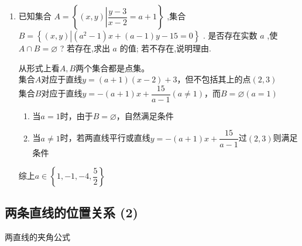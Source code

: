 \begin{enumerate}
    \item 已知集合 $A = \left\{  {\left( {x,y}\right) \left| {\dfrac{y - 3}{x - 2} = a + 1}\right. }\right\}$ ,集合 $B = \left\{  {\left( {x,y}\right) \left| {\left( {{a}^{2} - 1}\right) x + \left( {a - 1}\right) y - {15} = 0}\right. }\right\}$ . 是否存在实数 $a$ ,使 $A \cap  B = \varnothing$ ? 若存在,求出 $a$ 的值; 若不存在,说明理由.
    \begin{jieda}
        从形式上看$A, B$两个集合都是点集。\\
        集合$A$对应于直线$y = (a+1)(x-2) + 3$，但不包括其上的点$(2, 3)$ \\
        集合$B$对应于直线$y = -(a+1)x + \dfrac{15}{a-1} (a \neq 1)$，而$B = \varnothing (a = 1)$ 
        \begin{enumerate}
            \item 当$a = 1$时，由于$B = \varnothing$，自然满足条件
            \item 当$a \neq 1$时，若两直线平行或直线$y = -(a+1)x + \dfrac{15}{a-1}$过$(2, 3)$则满足条件
        \end{enumerate}
        综上$a \in \left\{1, -1, -4, \dfrac{5}{2}\right\}$
    \end{jieda} 
\end{enumerate}

\clearpage
\subsection*{两条直线的位置关系 (2)}

\zsd 两直线的夹角公式

